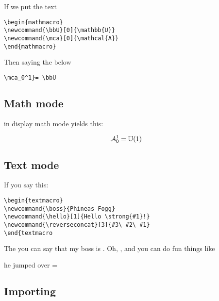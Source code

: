 If we put the text

\begin{verbatim}
\begin{mathmacro}
\newcommand{\bbU}[0]{\mathbb{U}}
\newcommand{\mca}[0]{\mathcal{A}}
\end{mathmacro}
\end{verbatim}


\begin{mathmacro}
\newcommand{\bbU}[0]{\mathbb{U}}
\newcommand{\mca}[0]{\mathcal{A}}
\end{mathmacro}

Then saying the below

\begin{verbatim}
\mca_0^1}= \bbU
\end{verbatim}

\subsection{Math mode}

in display math mode yields this:

$$
\mca_0^1 = \bbU(1)
$$


\subsection{Text mode}

\begin{textmacro}
\newcommand{\boss}{Phineas Fogg}
\newcommand{\hello}[1]{Hello \strong{#1}!}
\newcommand{\reverseconcat}[3]{#3#2#1}
\end{textmacro}


If you say this:

\begin{verbatim}
\begin{textmacro}
\newcommand{\boss}{Phineas Fogg}
\newcommand{\hello}[1]{Hello \strong{#1}!}
\newcommand{\reverseconcat}[3]{#3\ #2\ #1}
\end{textmacro
\end{verbatim}

The you can say that my boss is \boss. Oh, , and you can do fun things like

\begin{center}
he jumped over = 
\end{center}

\subsection{Importing}

